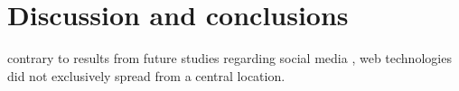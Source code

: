 \documentclass[
  authoryear,
  preprint,
  3p]{elsarticle}
\begin{document}
\hypertarget{discussion-and-conclusions}{%
\section{Discussion and conclusions}\label{discussion-and-conclusions}}

contrary to results from future studies regarding social media
\citep{lengyel2020role}, web technologies did not exclusively spread
from a central location.


\renewcommand\refname{References}
  
\end{document}
